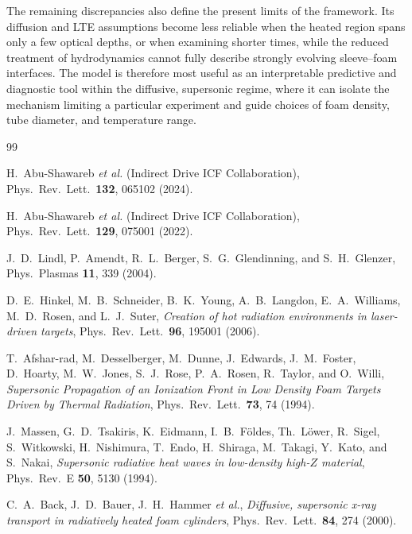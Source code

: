\documentclass[prl, twocolumn, superscriptaddress, amsmath, amssymb, reprint]{revtex4-2}
\begin{document}
The remaining discrepancies also define the present limits of the framework. Its diffusion and LTE assumptions become less reliable when the heated region spans only a few optical depths, or when examining shorter times, while the reduced treatment of hydrodynamics cannot fully describe strongly evolving sleeve--foam interfaces. The model is therefore most useful as an interpretable predictive and diagnostic tool within the diffusive, supersonic regime, where it can isolate the mechanism limiting a particular experiment and guide choices of foam density, tube diameter, and temperature range.
\endgroup

\begin{thebibliography}{99}

H.~Abu-Shawareb \textit{et al.} (Indirect Drive ICF Collaboration),
Phys.\ Rev.\ Lett.\ \textbf{132}, 065102 (2024).

H.~Abu-Shawareb \textit{et al.} (Indirect Drive ICF Collaboration),
Phys.\ Rev.\ Lett.\ \textbf{129}, 075001 (2022).

J.~D.~Lindl, P.~Amendt, R.~L.~Berger, S.~G.~Glendinning, and S.~H.~Glenzer,
Phys.\ Plasmas \textbf{11}, 339 (2004).

D.~E.~Hinkel, M.~B.~Schneider, B.~K.~Young, A.~B.~Langdon, E.~A.~Williams, M.~D.~Rosen, and L.~J.~Suter,
\textit{Creation of hot radiation environments in laser-driven targets},
Phys.\ Rev.\ Lett.\ \textbf{96}, 195001 (2006).

T.~Afshar-rad, M.~Desselberger, M.~Dunne, J.~Edwards, J.~M.~Foster, D.~Hoarty,
M.~W.~Jones, S.~J.~Rose, P.~A.~Rosen, R.~Taylor, and O.~Willi,
\textit{Supersonic Propagation of an Ionization Front in Low Density Foam Targets Driven by Thermal Radiation},
Phys.\ Rev.\ Lett.\ \textbf{73}, 74 (1994).

J.~Massen, G.~D.~Tsakiris, K.~Eidmann, I.~B.~F\"oldes, Th.~L\"ower, R.~Sigel,
S.~Witkowski, H.~Nishimura, T.~Endo, H.~Shiraga, M.~Takagi, Y.~Kato, and S.~Nakai,
\textit{Supersonic radiative heat waves in low-density high-$Z$ material},
Phys.\ Rev.\ E \textbf{50}, 5130 (1994).

C.~A.~Back, J.~D.~Bauer, J.~H.~Hammer \textit{et al.},
\textit{Diffusive, supersonic x-ray transport in radiatively heated foam cylinders},
Phys.\ Rev.\ Lett.\ \textbf{84}, 274 (2000).


\end{thebibliography}
\end{document}
